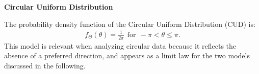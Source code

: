 \documentclass[remotesensing,article,submit,pdftex,moreauthors]{Definitions/mdpi}
\providecommand{\subsubsubsection}[1]{%
  \par\bigskip
  \noindent\textbf{#1}\par\nobreak\medskip
}
\begin{document}
%
%
%



\subsubsubsection{Circular Uniform Distribution}\label{sec:sec3.1.1_cap3}

The probability density function of the Circular Uniform Distribution (CUD) is:
\begin{eqnarray}\label{sec:sec3.1.1_cap3Eq1}
	f_{\Theta}(\theta)=\frac{1}{2\pi}~~\text{for}~~-\pi<\theta\leq\pi.
\end{eqnarray}
This model is relevant when analyzing circular data because it reflects the absence of a preferred direction, and appears as a limit law for the two models discussed in the following.
\end{document}
